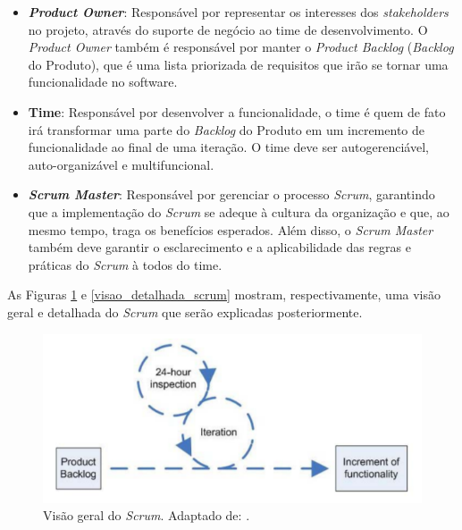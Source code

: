 \begin{itemize}
\item \textbf{\textit{Product Owner}}: Responsável por representar os interesses dos \textit{stakeholders} no projeto, através do suporte de negócio ao time de desenvolvimento. O \textit{Product Owner} também é responsável por manter o \textit{Product Backlog} (\textit{Backlog} do Produto), que é uma lista priorizada de requisitos que irão se tornar uma funcionalidade no software.

\item \textbf{Time}: Responsável por desenvolver a funcionalidade, o time é quem de fato irá transformar uma parte do \textit{Backlog} do Produto em um incremento de funcionalidade ao final de uma iteração. O time deve ser autogerenciável, auto-organizável e multifuncional.

\item \textbf{\textit{Scrum Master}}: Responsável por gerenciar o processo \textit{Scrum}, garantindo que a implementação do \textit{Scrum} se adeque à cultura da organização e que, ao mesmo tempo, traga os benefícios esperados. Além disso, o \textit{Scrum Master} também deve garantir o esclarecimento e a aplicabilidade das regras e práticas do \textit{Scrum} à todos do time.
\end{itemize}

As Figuras \ref{visao_geral_scrum} e \ref{visao_detalhada_scrum} mostram, respectivamente, uma visão geral e detalhada do \textit{Scrum} que serão explicadas posteriormente.

\begin{figure}[!htb]
	\centering
		\includegraphics[scale=0.7]{figuras/scrum}
	\caption{Visão geral do \textit{Scrum}. Adaptado de: \cite{scrum2005}.}
	\label{visao_geral_scrum}
\end{figure}

